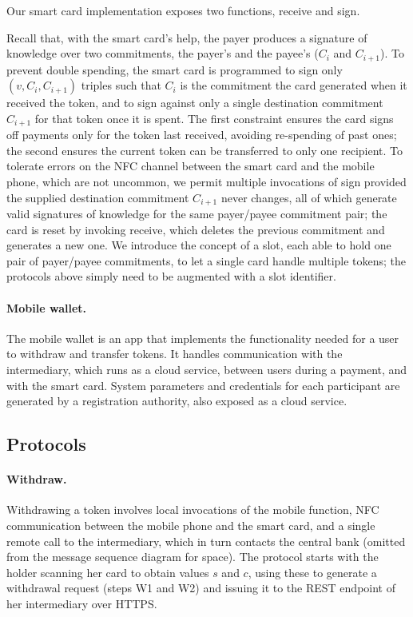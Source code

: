 Our smart card implementation exposes two functions, receive and
sign.

Recall that, with the smart card's help, the payer produces a signature of
knowledge over two commitments, the payer's and the payee's ($C_i$ and
$C_{i+1}$). To prevent double spending, the
smart card is programmed to sign only $(v, C_i, C_{i+1})$ triples such that
$C_i$ is the commitment the card generated when it received the token, and
to sign against only a single destination commitment $C_{i+1}$ for that
token once it is spent. The first constraint ensures the card signs off
payments only for the token last received, avoiding re-spending of past
ones; the second ensures the current token can be transferred to only one
recipient. To tolerate errors on the NFC channel between the smart card and
the mobile phone, which are not uncommon, we permit multiple invocations of
sign provided the supplied destination commitment $C_{i+1}$ never
changes, all of which generate valid signatures of knowledge for the same
payer/payee commitment pair; the card is reset by invoking receive,
which deletes the previous commitment and generates a new one. We introduce
the concept of a slot, each able to hold one pair of payer/payee
commitments, to let a single card handle multiple tokens; the protocols
above simply need to be augmented with a slot identifier.

\paragraph{Mobile wallet.} The mobile wallet is an app that implements the
functionality needed for a user to withdraw and transfer tokens. It handles
communication with the intermediary, which runs as a cloud service, between
users during a payment, and with the smart card. System parameters and
credentials for each participant are generated by a registration authority,
also exposed as a cloud service.

\subsection{Protocols}

\paragraph{Withdraw.} Withdrawing a token involves local invocations of the
mobile function, NFC communication between the mobile phone and the smart
card, and a single remote call to the intermediary, which in turn contacts
the central bank (omitted from the message sequence diagram for space). The
protocol starts with the holder scanning her card to obtain values $s$ and
$c$, using these to generate a withdrawal request (steps W1 and
W2) and issuing it to the REST
endpoint of her intermediary over HTTPS.

